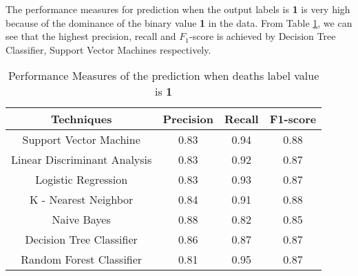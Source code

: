 \documentclass[conference]{IEEEtran}
\begin{document}
The performance measures for prediction when the output labels is \textbf{1} is very high because of the dominance of the binary value \textbf{1} in the data. From Table \ref{table:3}, we can see that the highest precision, recall and $F_1$-score is achieved by Decision Tree Classifier, Support Vector Machines respectively. 
\begin{table}[H]
\centering
 \begin{tabular}{|c| c c c|} 
 \hline
 Techniques  & Precision & Recall & F1-score \\ [0.5ex] 
 \hline
 Support Vector Machine & 0.83 & 0.94 & 0.88 \\ 
 \hline
 Linear Discriminant Analysis & 0.83 & 0.92 & 0.87\\
 \hline
 Logistic Regression & 0.83 & 0.93 & 0.87\\
 \hline
 K - Nearest Neighbor & 0.84 & 0.91 & 0.88\\
 \hline
 Naive Bayes & 0.88 & 0.82 & 0.85\\  
 \hline
 Decision Tree Classifier & 0.86 & 0.87 & 0.87 \\
 \hline
 Random Forest Classifier & 0.81 & 0.95 & 0.87  \\[0.75ex] 
 \hline
\end{tabular}
\vspace*{0.25cm}
\caption{Performance Measures of the prediction when deaths label value is \textbf{1}}
\label{table:3}
\end{table}







\end{document}
